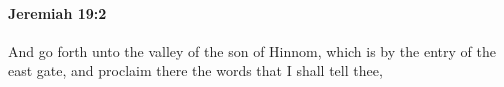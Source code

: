 
		\paragraph{Jeremiah 19:2} %
			\label{JEREMIAH-19-2}

			And go forth unto the valley of the son of Hinnom, which is by the entry of the east gate, and proclaim there the words that I shall tell thee,


